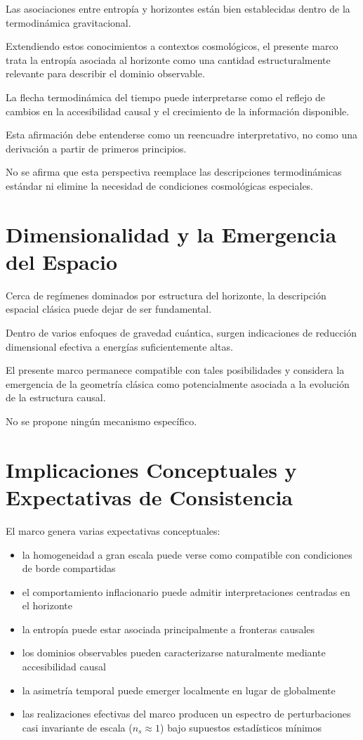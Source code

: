 \documentclass[12pt,a4paper]{article}
\begin{document}
Las asociaciones entre entropía y horizontes están bien establecidas dentro de la termodinámica gravitacional.

Extendiendo estos conocimientos a contextos cosmológicos, el presente marco trata la entropía asociada al horizonte como una cantidad estructuralmente relevante para describir el dominio observable.

La flecha termodinámica del tiempo puede interpretarse como el reflejo de cambios en la accesibilidad causal y el crecimiento de la información disponible.

Esta afirmación debe entenderse como un reencuadre interpretativo, no como una derivación a partir de primeros principios.

No se afirma que esta perspectiva reemplace las descripciones termodinámicas estándar ni elimine la necesidad de condiciones cosmológicas especiales.

\section{Dimensionalidad y la Emergencia del Espacio}

Cerca de regímenes dominados por estructura del horizonte, la descripción espacial clásica puede dejar de ser fundamental.

Dentro de varios enfoques de gravedad cuántica, surgen indicaciones de reducción dimensional efectiva a energías suficientemente altas.

El presente marco permanece compatible con tales posibilidades y considera la emergencia de la geometría clásica como potencialmente asociada a la evolución de la estructura causal.

No se propone ningún mecanismo específico.

\section{Implicaciones Conceptuales y Expectativas de Consistencia}

El marco genera varias expectativas conceptuales:

\begin{itemize}
  \item la homogeneidad a gran escala puede verse como compatible con condiciones de borde compartidas
  \item el comportamiento inflacionario puede admitir interpretaciones centradas en el horizonte
  \item la entropía puede estar asociada principalmente a fronteras causales
  \item los dominios observables pueden caracterizarse naturalmente mediante accesibilidad causal
  \item la asimetría temporal puede emerger localmente en lugar de globalmente
  \item las realizaciones efectivas del marco producen un espectro de perturbaciones casi invariante de escala ($n_s \approx 1$) bajo supuestos estadísticos mínimos
\end{itemize}
\end{document}
